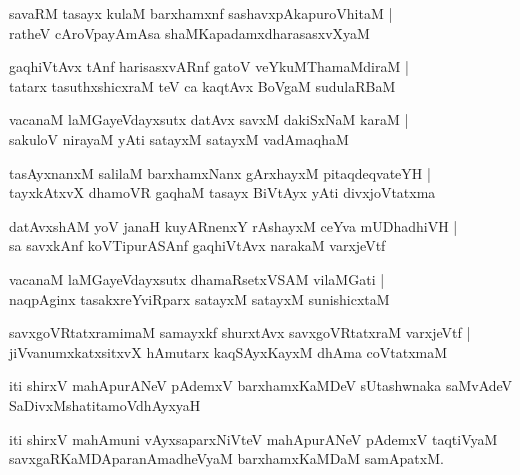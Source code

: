 \begin{shloka}
savaRM tasayx kulaM barxhamxnf sashavxpAkapuroVhitaM |\\
ratheV cAroVpayAmAsa shaMKapadamxdharasasxvXyaM 
\end{shloka}

\begin{shloka}
gaqhiVtAvx tAnf harisasxvARnf gatoV veYkuMThamaMdiraM |\\
tatarx tasuthxshicxraM teV ca kaqtAvx BoVgaM sudulaRBaM
\end{shloka}

\begin{shloka}
vacanaM laMGayeVdayxsutx datAvx savxM dakiSxNaM karaM |\\
sakuloV nirayaM yAti satayxM satayxM vadAmaqhaM 
\end{shloka}

\begin{shloka}
tasAyxnanxM salilaM barxhamxNanx gArxhayxM pitaqdeqvateYH |\\
tayxkAtxvX dhamoVR gaqhaM tasayx BiVtAyx yAti divxjoVtatxma 
\end{shloka}

\begin{shloka}
datAvxshAM yoV janaH kuyARnenxY rAshayxM ceYva mUDhadhiVH |\\
sa savxkAnf koVTipurASAnf gaqhiVtAvx narakaM varxjeVtf
\end{shloka}

\begin{shloka}
vacanaM laMGayeVdayxsutx dhamaRsetxVSAM vilaMGati |\\
naqpAginx tasakxreYviRparx satayxM satayxM sunishicxtaM 
\end{shloka}

\begin{shloka}
savxgoVRtatxramimaM samayxkf shurxtAvx savxgoVRtatxraM varxjeVtf |\\
jiVvanumxkatxsitxvX hAmutarx kaqSAyxKayxM dhAma coVtatxmaM
\end{shloka}
iti shirxV mahApurANeV pAdemxV barxhamxKaMDeV sUtashwnaka saMvAdeV SaDivxMshatitamoVdhAyxyaH

iti shirxV mahAmuni vAyxsaparxNiVteV mahApurANeV pAdemxV taqtiVyaM savxgaRKaMDAparanAmadheVyaM barxhamxKaMDaM samApatxM.
